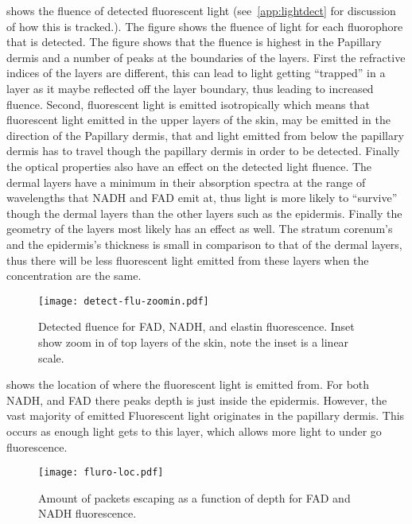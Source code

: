  shows the fluence of detected fluorescent light (see~\cref{app:lightdect} for discussion of how this is tracked.).
The figure shows the fluence of light for each fluorophore that is detected.
The figure shows that the fluence is highest in the Papillary dermis and a number of peaks at the boundaries of the layers.
First the refractive indices of the layers are different, this can lead to light getting ``trapped'' in a layer as it maybe reflected off the layer boundary, thus leading to increased fluence.
Second, fluorescent light is emitted isotropically which means that fluorescent light emitted in the upper layers of the skin, may be emitted in the direction of the Papillary dermis, that and light emitted from below the papillary dermis has to travel though the papillary dermis in order to be detected.
Finally the optical properties also have an effect on the detected light fluence.
The dermal layers have a minimum in their absorption spectra at the range of wavelengths that NADH and FAD emit at, thus light is more likely to ``survive'' though the dermal layers than the other layers such as the epidermis.
Finally the geometry of the layers most likely has an effect as well.
The stratum corenum's and the epidermis's thickness is small in comparison to that of the dermal layers, thus there will be less fluorescent light emitted from these layers when the concentration are the same.

\begin{figure}[!htpb]
    \centering
    \texttt{[image: detect-flu-zoomin.pdf]}
    \caption{Detected fluence for FAD, NADH, and elastin fluorescence. Inset show zoom in of top layers of the skin, note the inset is a linear scale.}
    \label{fig:fadnadhboth}
\end{figure}

 shows the location of where the fluorescent light is emitted from.
For both NADH, and FAD there peaks depth is just inside the epidermis.
However, the vast majority of emitted Fluorescent light originates in the papillary dermis.
This occurs as enough light gets to this layer, which allows more light to under go fluorescence. 


\begin{figure}[!htpb]
    \centering
    \texttt{[image: fluro-loc.pdf]}
    \caption{Amount of packets escaping as a function of depth for FAD and NADH fluorescence.}
    \label{fig:floc}
\end{figure}

